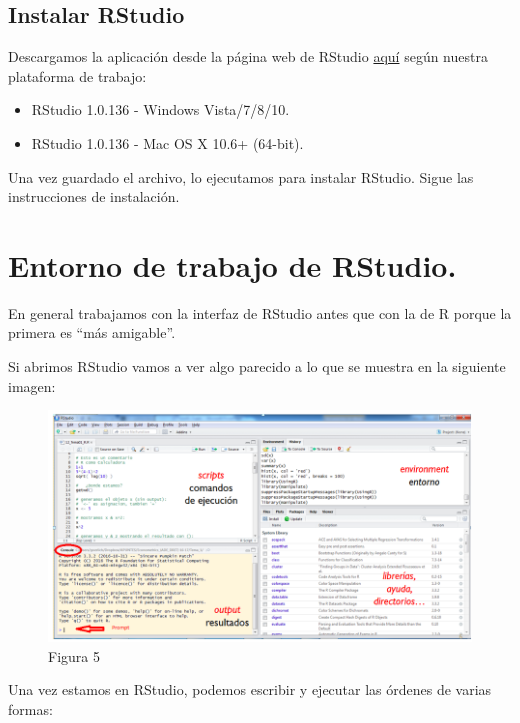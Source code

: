 \documentclass[
]{book}
\begin{document}
\hypertarget{instalar-rstudio}{%
\subsection{Instalar RStudio}\label{instalar-rstudio}}

Descargamos la aplicación desde la página web de RStudio \href{https://posit.co/download/rstudio-desktop/}{aquí} según nuestra plataforma de trabajo:

\begin{itemize}
\item
  RStudio 1.0.136 - Windows Vista/7/8/10.
\item
  RStudio 1.0.136 - Mac OS X 10.6+ (64-bit).
\end{itemize}

Una vez guardado el archivo, lo ejecutamos para instalar RStudio. Sigue las instrucciones de instalación.

\hypertarget{entorno-de-trabajo-de-rstudio.}{%
\section{Entorno de trabajo de RStudio.}\label{entorno-de-trabajo-de-rstudio.}}

En general trabajamos con la interfaz de RStudio antes que con la de R porque la primera es ``más amigable''.

Si abrimos RStudio vamos a ver algo parecido a lo que se muestra en la siguiente imagen:

\begin{figure}
\centering
\includegraphics{imagenes/05.png}
\caption{Figura 5}
\end{figure}

Una vez estamos en RStudio, podemos escribir y ejecutar las órdenes de varias formas:
\end{document}
